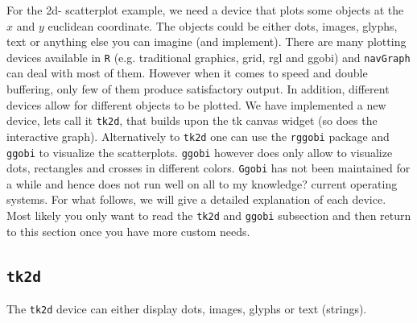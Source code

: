 \documentclass[12pt,oneside,titlepage,letter]{article}
\newcommand{\modify}[1]{{\color{blue}#1}}
\begin{document}
For the 2d- scatterplot example, we need a device that plots some objects at the $x$ and $y$ euclidean coordinate. The objects could be either dots, images, glyphs, text or anything else you can imagine (and implement). There are many plotting devices available in \texttt{R} (e.g. traditional graphics, grid, rgl and ggobi) and \texttt{navGraph} can deal with most of them. However when it comes to speed and \modify{double buffering}, only few of them produce satisfactory output. In addition, different devices allow for different objects to be plotted. \modify{We have implemented a new device, lets call it \texttt{tk2d},} that builds upon the tk canvas widget (so does the interactive graph). Alternatively to \texttt{tk2d} one can use the \texttt{rggobi} package and \texttt{ggobi} to visualize the scatterplots. \texttt{ggobi} however does only allow to visualize dots, rectangles and \modify{crosses} in different colors. \texttt{Ggobi} has not been maintained for a while and hence does not run well on \modify{all to my knowledge?} current operating systems. For what follows, we will give a detailed explanation of each device. \modify{Most likely you only want to read the \texttt{tk2d} and \texttt{ggobi} subsection and then return to this section once you have more custom needs}. 


\subsection{\texttt{tk2d}}
The \texttt{tk2d} device can either display dots, images, glyphs or text (strings). 
\end{document}
